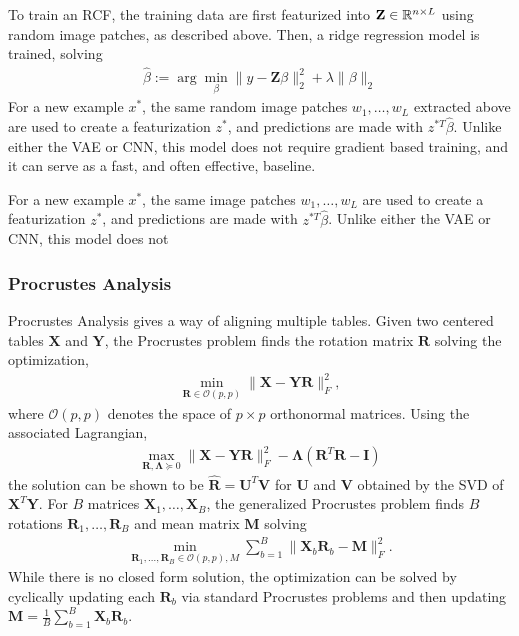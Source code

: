 To train an RCF, the training data are first featurized into $\mathbf{Z} \in
\mathbb{R}^{n \times L}$ using random image patches, as described above. Then, a
ridge regression model is trained, solving
\begin{align*}
\hat{\beta} := \arg \min_{\beta} \|y - \mathbf{Z}\beta\|_{2}^{2} + \lambda \|\beta\|_{2}
\end{align*}
For a new example $x^{\ast}$, the same random image patches $w_{1}, \dots,
w_{L}$ extracted above are used to create a featurization $z^{\ast}$, and
predictions are made with $z^{\ast T}\hat{\beta}$. Unlike either the VAE or CNN,
this model does not require gradient based training, and it can serve as a fast,
and often effective, baseline.

For a new example $x^{\ast}$, the same image patches $w_{1}, \dots, w_{L}$ are
used to create a featurization $z^{\ast}$, and predictions are made with
$z^{\ast T}\hat{\beta}$. Unlike either the VAE or CNN, this model does not

\subsubsection{Procrustes Analysis}
Procrustes Analysis gives a way of aligning multiple tables. Given two centered
tables $\mathbf{X}$ and $\mathbf{Y}$, the Procrustes problem finds the rotation
matrix $\mathbf{R}$ solving the optimization,
\begin{align*}
\min_{\mathbf{R} \in \mathcal{O}\left(p, p\right)} \|\mathbf{X} - \mathbf{Y}\mathbf{R}\|^{2}_{F},
\end{align*}
where $\mathcal{O}\left(p, p\right)$ denotes the space of $p\times p$
orthonormal matrices. Using the associated Lagrangian,
\begin{align*}
\max_{\mathbf{R}, \mathbf{\Lambda} \succeq 0} \|\mathbf{X} - \mathbf{Y}\mathbf{R}\|_{F}^{2} - \mathbf{\Lambda}\left(\mathbf{R}^{T}\mathbf{R} - \mathbf{I}\right)
\end{align*}
the solution can be shown to be $\hat{\mathbf{R}} = \mathbf{U}^{T}\mathbf{V}$
for $\mathbf{U}$ and $\mathbf{V}$ obtained by the SVD of
$\mathbf{X}^{T}\mathbf{Y}$. For $B$ matrices $\mathbf{X}_{1}, \dots,
\mathbf{X}_{B}$, the generalized Procrustes problem finds $B$ rotations
$\mathbf{R}_{1}, \dots, \mathbf{R}_{B}$ and mean matrix $\mathbf{M}$ solving
\begin{align*}
\min_{\mathbf{R}_{1}, \dots, \mathbf{R}_{B} \in \mathcal{O}\left(p, p\right), M} \sum_{b = 1}^{B} \|\mathbf{X}_{b}\mathbf{R}_{b} - \mathbf{M}\|_{F}^{2}.
\end{align*}
While there is no closed form solution, the optimization can be solved by
cyclically updating each $\mathbf{R}_{b}$ via standard Procrustes problems and
then updating $\mathbf{M} = \frac{1}{B} \sum_{b = 1}^{B} \mathbf{X}_{b}
\mathbf{R}_{b}$.

